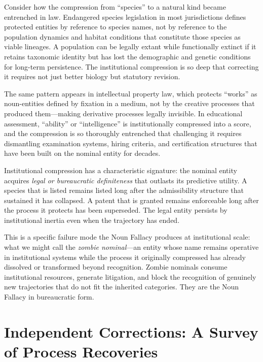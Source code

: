 \documentclass[12pt, a4paper]{article}
\theoremstyle{plain}
\theoremstyle{definition}
\theoremstyle{remark}
\begin{document}
Consider how the compression from ``species'' to a natural kind became
entrenched in law. Endangered species legislation in most jurisdictions defines
protected entities by reference to species names, not by reference to the
population dynamics and habitat conditions that constitute those species as
viable lineages. A population can be legally extant while functionally extinct
if it retains taxonomic identity but has lost the demographic and genetic
conditions for long-term persistence. The institutional compression is so deep
that correcting it requires not just better biology but statutory revision.

The same pattern appears in intellectual property law, which protects ``works''
as noun-entities defined by fixation in a medium, not by the creative processes
that produced them---making derivative processes legally invisible. In
educational assessment, ``ability'' or ``intelligence'' is institutionally
compressed into a score, and the compression is so thoroughly entrenched that
challenging it requires dismantling examination systems, hiring criteria, and
certification structures that have been built on the nominal entity for decades.

Institutional compression has a characteristic signature: the nominal entity
acquires \emph{legal or bureaucratic definiteness} that outlasts its predictive
utility. A species that is listed remains listed long after the admissibility
structure that sustained it has collapsed. A patent that is granted remains
enforceable long after the process it protects has been superseded. The legal
entity persists by institutional inertia even when the trajectory has ended.

This is a specific failure mode the Noun Fallacy produces at institutional
scale: what we might call the \emph{zombie nominal}---an entity whose name
remains operative in institutional systems while the process it originally
compressed has already dissolved or transformed beyond recognition. Zombie
nominals consume institutional resources, generate litigation, and block the
recognition of genuinely new trajectories that do not fit the inherited
categories. They are the Noun Fallacy in bureaucratic form.

\section{Independent Corrections: A Survey of Process Recoveries}
\label{sec:survey}
\end{document}
